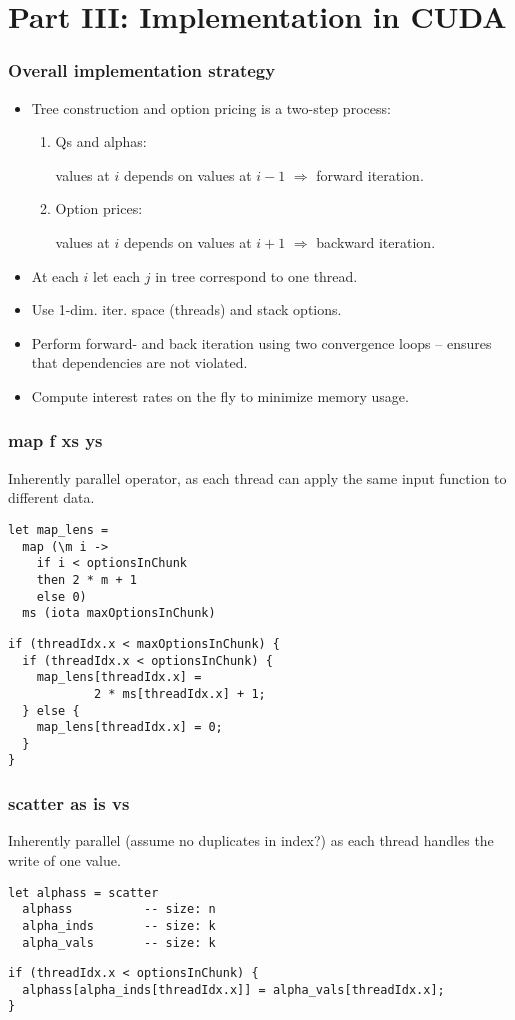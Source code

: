 \section{Part III: Implementation in CUDA}

\begin{frame}
  \frametitle{Overall implementation strategy}
  \begin{itemize}
    \item Tree construction and option pricing is a two-step
      process:
      \begin{enumerate}
      \item Qs and alphas:

        values at $i$ depends on values at $i-1$
        $\Rightarrow$ forward iteration.
      \item Option prices:

        values at $i$ depends on values at $i+1$
        $\Rightarrow$ backward iteration.
      \end{enumerate}
    \item At each $i$ let each $j$ in tree correspond to one
      thread.
    \item Use 1-dim. iter. space (threads) and stack
      options.
    \item Perform forward- and back iteration using two
      convergence loops -- ensures that dependencies are not
      violated.
    \item Compute interest rates on the fly to minimize
      memory usage.
  \end{itemize}
\end{frame}


\begin{frame}[fragile]
  \frametitle{map f xs ys}
%
Inherently parallel operator, as each thread can apply the same input
function to different data.
%
\begin{lstlisting}
let map_lens =
  map (\m i ->
    if i < optionsInChunk
    then 2 * m + 1
    else 0)
  ms (iota maxOptionsInChunk)
\end{lstlisting}
%
\begin{lstlisting}
if (threadIdx.x < maxOptionsInChunk) {
  if (threadIdx.x < optionsInChunk) {
    map_lens[threadIdx.x] =
            2 * ms[threadIdx.x] + 1;
  } else {
    map_lens[threadIdx.x] = 0;
  }
}
\end{lstlisting}
\end{frame}

\begin{frame}[fragile]
  \frametitle{scatter as is vs}
%
Inherently parallel (assume no duplicates in index?) as each thread
handles the write of one value.
%
%
\begin{lstlisting}
let alphass = scatter
  alphass          -- size: n
  alpha_inds       -- size: k
  alpha_vals       -- size: k
\end{lstlisting}
%
\begin{lstlisting}
if (threadIdx.x < optionsInChunk) {
  alphass[alpha_inds[threadIdx.x]] = alpha_vals[threadIdx.x];
}
\end{lstlisting}
\end{frame}

